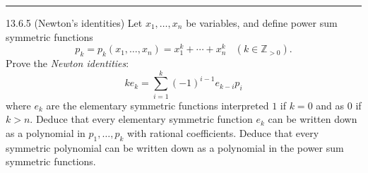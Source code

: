 \documentclass[a4paper, 12pt]{article}
\begin{document}
\noindent\rule{7in}{2.8pt}
\begin{problem}{13.6.5 (Newton's identities)}
Let \(x_1,\ldots, x_n\) be variables, and define power sum symmetric functions
\[p_k=p_k(x_1,\ldots,x_n)=x_1^k+\cdots+x_n^k\ \ \ \ (k\in \mathbb{Z}_{>0}).\]
Prove the \textit{Newton identities}:
\[ke_k=\sum_{i=1}^k(-1)^{i-1}e_{k-i}p_i\]
where \(e_k\) are the elementary symmetric functions interpreted \(1\) if \(k=0\) and as \(0\) if \(k>n\). Deduce that every elementary symmetric function \(e_k\) can be written down as a polynomial in \(p_1,\ldots, p_k\) with rational coefficients. Deduce that every symmetric polynomial can be written down as a polynomial in the power sum symmetric functions.
\end{problem}
\end{document}
